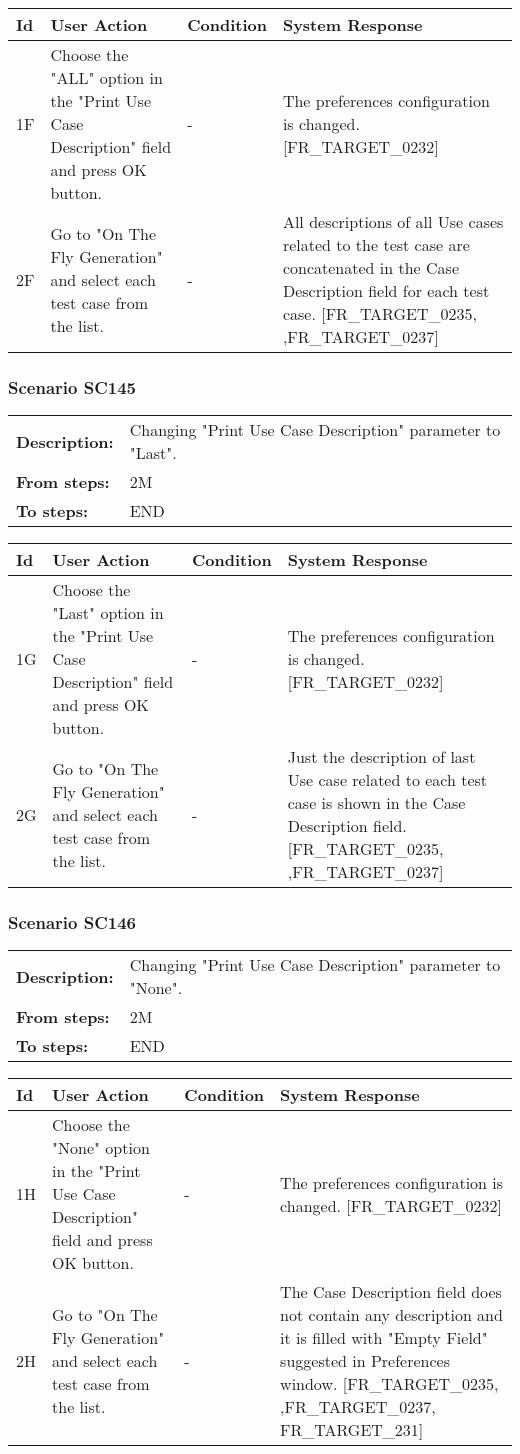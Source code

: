 \documentclass[a4paper,11pt]{article}
\newcommand{\bl}{\\ \hline}
\begin{document}
\begin{tabular}{|p{0.8in}|p{1.6in}|p{1.6in}|p{1.6in}|}
\hline
Id & User Action & Condition & System Response  \bl 
1F & Choose the "ALL" option in the "Print Use Case Description"
						field and press OK button. & - & The preferences configuration is changed.
						[FR_TARGET_0232] \bl 
2F & Go to "On The Fly Generation" and select each test case
						from the list. & - & All descriptions of all Use cases related to the test
						case are concatenated in the Case Description field for each test
						case. [FR_TARGET_0235, ,FR_TARGET_0237] \bl 
\end{tabular}
\subsubsection*{Scenario SC145}
\begin{tabular}{p{1in}p{4in}}
{\bf Description:} & Changing "Print Use Case Description" parameter to
					"Last". \\
{\bf From steps:} & 2M \\
{\bf To steps:} & END \\
\end{tabular}
 
\begin{tabular}{|p{0.8in}|p{1.6in}|p{1.6in}|p{1.6in}|}
\hline
Id & User Action & Condition & System Response  \bl 
1G & Choose the "Last" option in the "Print Use Case
						Description" field and press OK button. & - & The preferences configuration is changed.
						[FR_TARGET_0232] \bl 
2G & Go to "On The Fly Generation" and select each test case
						from the list. & - & Just the description of last Use case related to each
						test case is shown in the Case Description field. [FR_TARGET_0235,
						,FR_TARGET_0237] \bl 
\end{tabular}
\subsubsection*{Scenario SC146}
\begin{tabular}{p{1in}p{4in}}
{\bf Description:} & Changing "Print Use Case Description" parameter to
					"None". \\
{\bf From steps:} & 2M \\
{\bf To steps:} & END \\
\end{tabular}
 
\begin{tabular}{|p{0.8in}|p{1.6in}|p{1.6in}|p{1.6in}|}
\hline
Id & User Action & Condition & System Response  \bl 
1H & Choose the "None" option in the "Print Use Case
						Description" field and press OK button. & - & The preferences configuration is changed.
						[FR_TARGET_0232] \bl 
2H & Go to "On The Fly Generation" and select each test case
						from the list. & - & The Case Description field does not contain any
						description and it is filled with "Empty Field" suggested in
						Preferences window. [FR_TARGET_0235, ,FR_TARGET_0237,
						FR_TARGET_231] \bl 
\end{tabular}
\end{document}
